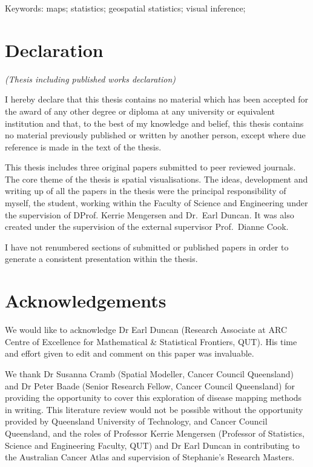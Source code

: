 \documentclass{monashthesis}
\begin{document}
Keywords: maps; statistics; geospatial statistics; visual inference;
\newpage

\hypertarget{declaration}{%
\chapter*{Declaration}\label{declaration}}

\emph{(Thesis including published works declaration)}

I hereby declare that this thesis contains no material which has been accepted for the award of any other degree or diploma at any university or equivalent institution and that, to the best of my knowledge and belief, this thesis contains no material previously published or written by another person, except where due reference is made in the text of the thesis.

This thesis includes three original papers submitted to peer reviewed journals. The core theme of the thesis is spatial visualisations. The ideas, development and writing up of all the papers in the thesis were the principal responsibility of myself, the student, working within the Faculty of Science and Engineering under the supervision of DProf. Kerrie Mengersen and Dr.~Earl Duncan. It was also created under the supervision of the external supervisor Prof.~Dianne Cook.

I have not renumbered sections of submitted or published papers in order to generate a consistent presentation within the thesis.



\hypertarget{acknowledgements}{%
\chapter*{Acknowledgements}\label{acknowledgements}}

We would like to acknowledge Dr Earl Duncan (Research Associate at ARC Centre of Excellence for Mathematical \& Statistical Frontiers, QUT). His time and effort given to edit and comment on this paper was invaluable.

We thank Dr Susanna Cramb (Spatial Modeller, Cancer Council Queensland) and Dr Peter Baade (Senior Research Fellow, Cancer Council Queensland) for providing the opportunity to cover this exploration of disease mapping methods in writing.
This literature review would not be possible without the opportunity provided by Queensland University of Technology, and Cancer Council Queensland, and the roles of Professor Kerrie Mengersen (Professor of Statistics, Science and Engineering Faculty, QUT) and Dr Earl Duncan in contributing to the Australian Cancer Atlas and supervision of Stephanie's Research Masters.
\end{document}
